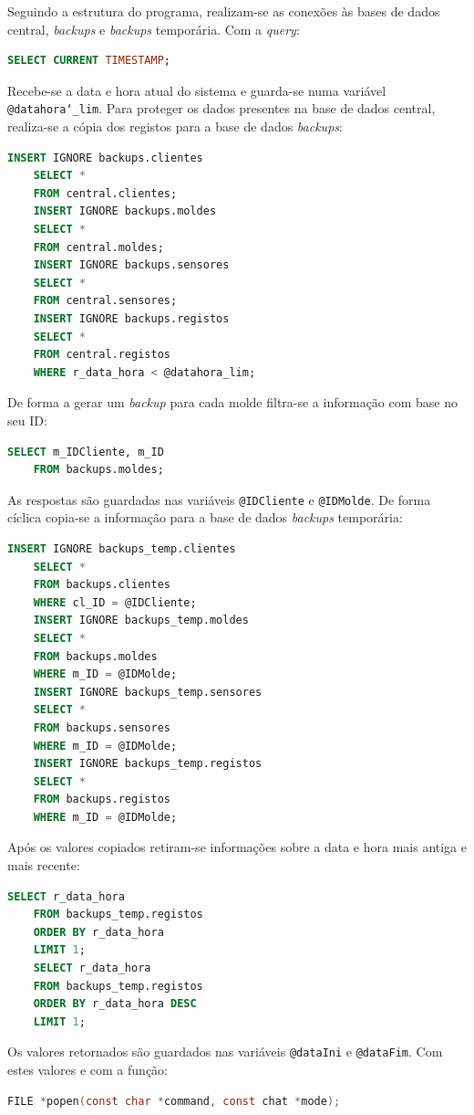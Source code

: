 \documentclass[11pt,twoside,a4paper]{report}
\begin{document}
Seguindo a estrutura do programa, realizam-se as conexões às bases de dados central, \textit{backups} e \textit{backups} temporária. Com a \textit{query}:
\begin{lstlisting}[language = SQL]
	SELECT CURRENT TIMESTAMP;
\end{lstlisting}
Recebe-se a data e hora atual do sistema e guarda-se numa variável \texttt{@datahora\char`_lim}. Para proteger os dados presentes na base de dados central, realiza-se a cópia dos registos para a base de dados \textit{backups}:
\begin{lstlisting}[language = SQL]
	INSERT IGNORE backups.clientes
	SELECT *
	FROM central.clientes;
	INSERT IGNORE backups.moldes
	SELECT *
	FROM central.moldes;
	INSERT IGNORE backups.sensores
	SELECT *
	FROM central.sensores;
	INSERT IGNORE backups.registos
	SELECT *
	FROM central.registos
	WHERE r_data_hora < @datahora_lim;
\end{lstlisting}
De forma a gerar um \textit{backup} para cada molde filtra-se a informação com base no seu ID:
\begin{lstlisting}[language = SQL]
	SELECT m_IDCliente, m_ID
	FROM backups.moldes;
\end{lstlisting}
As respostas são guardadas nas variáveis \texttt{@IDCliente} e \texttt{@IDMolde}. De forma cíclica copia-se a informação para a base de dados \textit{backups} temporária:
\begin{lstlisting}[language = SQL]
	INSERT IGNORE backups_temp.clientes
	SELECT *
	FROM backups.clientes
	WHERE cl_ID = @IDCliente;
	INSERT IGNORE backups_temp.moldes
	SELECT *
	FROM backups.moldes
	WHERE m_ID = @IDMolde;
	INSERT IGNORE backups_temp.sensores
	SELECT *
	FROM backups.sensores
	WHERE m_ID = @IDMolde;
	INSERT IGNORE backups_temp.registos
	SELECT *
	FROM backups.registos
	WHERE m_ID = @IDMolde;
\end{lstlisting}
Após os valores copiados retiram-se informações sobre a data e hora mais antiga e mais recente:
\begin{lstlisting}[language = SQL]
	SELECT r_data_hora
	FROM backups_temp.registos
	ORDER BY r_data_hora
	LIMIT 1;
	SELECT r_data_hora
	FROM backups_temp.registos
	ORDER BY r_data_hora DESC
	LIMIT 1;
\end{lstlisting}
Os valores retornados são guardados nas variáveis \texttt{@dataIni} e \texttt{@dataFim}. Com estes valores e com a função:
\begin{lstlisting}[language = C]
	FILE *popen(const char *command, const chat *mode);
\end{lstlisting}
\end{document}
